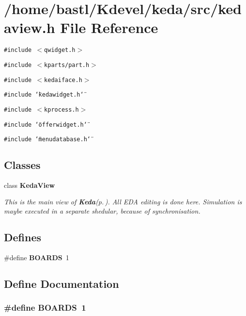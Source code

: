 \section{/home/bastl/Kdevel/keda/src/kedaview.h File Reference}
\label{kedaview_8h}
{\tt \#include $<$qwidget.h$>$}\par
{\tt \#include $<$kparts/part.h$>$}\par
{\tt \#include $<$kedaiface.h$>$}\par
{\tt \#include \char`\"{}kedawidget.h\char`\"{}}\par
{\tt \#include $<$kprocess.h$>$}\par
{\tt \#include \char`\"{}offerwidget.h\char`\"{}}\par
{\tt \#include \char`\"{}menudatabase.h\char`\"{}}\par
\subsection*{Classes}
\begin{CompactItemize}
\item 
class {\bf Keda\-View}
\begin{CompactList}\small\item\em This is the main view of {\bf Keda}{\rm (p.\,\pageref{classKeda})}. All EDA editing is done here. Simulation is maybe executed in a separate shedular, because of synchronisation. \item\end{CompactList}\end{CompactItemize}
\subsection*{Defines}
\begin{CompactItemize}
\item 
\#define {\bf BOARDS}~1
\end{CompactItemize}


\subsection{Define Documentation}
\subsubsection{\setlength{\rightskip}{0pt plus 5cm}\#define BOARDS~1}\label{kedaview_8h_bdeab5be7e648ebf494dff98c8d794e7}


